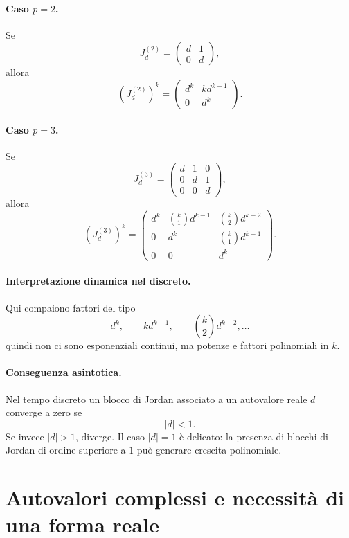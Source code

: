\paragraph{Caso $p=2$.}
Se
\[
J_d^{(2)}=
\begin{pmatrix}
d & 1\\
0 & d
\end{pmatrix},
\]
allora
\[
\left(J_d^{(2)}\right)^k
=
\begin{pmatrix}
d^k & k d^{k-1}\\
0 & d^k
\end{pmatrix}.
\]

\paragraph{Caso $p=3$.}
Se
\[
J_d^{(3)}=
\begin{pmatrix}
d & 1 & 0\\
0 & d & 1\\
0 & 0 & d
\end{pmatrix},
\]
allora
\[
\left(J_d^{(3)}\right)^k
=
\begin{pmatrix}
d^k & \binom{k}{1}d^{k-1} & \binom{k}{2}d^{k-2}\\
0 & d^k & \binom{k}{1}d^{k-1}\\
0 & 0 & d^k
\end{pmatrix}.
\]

\paragraph{Interpretazione dinamica nel discreto.}
Qui compaiono fattori del tipo
\[
d^k,\qquad kd^{k-1},\qquad \binom{k}{2}d^{k-2},\dots
\]
quindi non ci sono esponenziali continui, ma potenze e fattori polinomiali in $k$.

\paragraph{Conseguenza asintotica.}
Nel tempo discreto un blocco di Jordan associato a un autovalore reale $d$ converge a zero se
\[
|d|<1.
\]
Se invece $|d|>1$, diverge.  
Il caso $|d|=1$ è delicato: la presenza di blocchi di Jordan di ordine superiore a $1$ può generare crescita polinomiale.

\section{Autovalori complessi e necessità di una forma reale}

